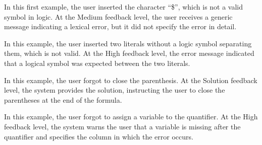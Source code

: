 \vspace{1em}
In this first example, the user inserted the character ``\$'', which is not a valid symbol in logic. At the Medium feedback level, the user receives a generic message indicating a lexical error, but it did not specify the error in detail.

\begin{center}
\end{center}

In this example, the user inserted two literals without a logic symbol separating them, which is not valid. At the High feedback level, the error message indicated that a logical symbol was expected between the two literals.

\begin{center}
\end{center}

In this example, the user forgot to close the parenthesis. At the Solution feedback level, the system provides the solution, instructing the user to close the parentheses at the end of the formula.

\begin{center}
\end{center}

In this example, the user forgot to assign a variable to the quantifier. At the High feedback level, the system warns the user that a variable is missing after the quantifier and specifies the column in which the error occurs.

\begin{center}
\end{center}

